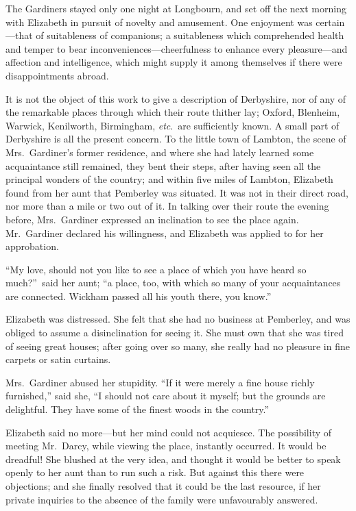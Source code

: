 \documentclass[12pt,english]{book}
\begin{document}
The Gardiners stayed only one night at Longbourn, and set off the
next morning with Elizabeth in pursuit of novelty and amusement. One
enjoyment was certain\mbox{---}that of suitableness of companions;
a suitableness which comprehended health and temper to bear inconveniences\mbox{---}cheerfulness
to enhance every pleasure\mbox{---}and affection and intelligence,
which might supply it among themselves if there were disappointments
abroad.

It is not the object of this work to give a description of Derbyshire,
nor of any of the remarkable places through which their route thither
lay; Oxford, Blenheim, Warwick, Kenilworth, Birmingham, \textit{etc}.\ are
sufficiently known. A small part of Derbyshire is all the present
concern. To the little town of Lambton, the scene of Mrs.\ Gardiner's
former residence, and where she had lately learned some acquaintance
still remained, they bent their steps, after having seen all the principal
wonders of the country; and within five miles of Lambton, Elizabeth
found from her aunt that Pemberley was situated. It was not in their
direct road, nor more than a mile or two out of it. In talking over
their route the evening before, Mrs.\ Gardiner expressed an inclination
to see the place again. Mr.\ Gardiner declared his willingness, and
Elizabeth was applied to for her approbation.

{}``My love, should not you like to see a place of which you have
heard so much?''\ said her aunt; {}``a place, too, with which so
many of your acquaintances are connected. Wickham passed all his youth
there, you know.''

Elizabeth was distressed. She felt that she had no business at Pemberley,
and was obliged to assume a disinclination for seeing it. She must
own that she was tired of seeing great houses; after going over so
many, she really had no pleasure in fine carpets or satin curtains.

Mrs.\ Gardiner abused her stupidity. {}``If it were merely a fine
house richly furnished,'' said she, {}``I should not care about
it myself; but the grounds are delightful. They have some of the finest
woods in the country.''

Elizabeth said no more\mbox{---}but her mind could not acquiesce.
The possibility of meeting Mr.\ Darcy, while viewing the place, instantly
occurred. It would be dreadful! She blushed at the very idea, and
thought it would be better to speak openly to her aunt than to run
such a risk. But against this there were objections; and she finally
resolved that it could be the last resource, if her private inquiries
to the absence of the family were unfavourably answered.
\end{document}

